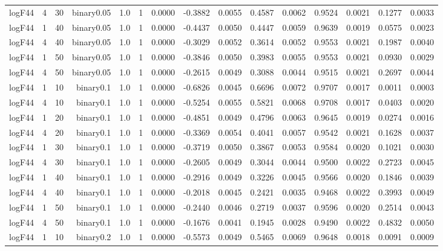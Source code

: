 \begin{longtable}{rrrrrrrrrrrrrrr}
  logF44 & 4 & 30 & binary0.05 & 1.0 & 1 & 0.0000 & -0.3882 & 0.0055 & 0.4587 & 0.0062 & 0.9524 & 0.0021 & 0.1277 & 0.0033 \\ 
  logF44 & 1 & 40 & binary0.05 & 1.0 & 1 & 0.0000 & -0.4437 & 0.0050 & 0.4447 & 0.0059 & 0.9639 & 0.0019 & 0.0575 & 0.0023 \\ 
  logF44 & 4 & 40 & binary0.05 & 1.0 & 1 & 0.0000 & -0.3029 & 0.0052 & 0.3614 & 0.0052 & 0.9553 & 0.0021 & 0.1987 & 0.0040 \\ 
  logF44 & 1 & 50 & binary0.05 & 1.0 & 1 & 0.0000 & -0.3846 & 0.0050 & 0.3983 & 0.0055 & 0.9553 & 0.0021 & 0.0930 & 0.0029 \\ 
  logF44 & 4 & 50 & binary0.05 & 1.0 & 1 & 0.0000 & -0.2615 & 0.0049 & 0.3088 & 0.0044 & 0.9515 & 0.0021 & 0.2697 & 0.0044 \\ 
  logF44 & 1 & 10 & binary0.1 & 1.0 & 1 & 0.0000 & -0.6826 & 0.0045 & 0.6696 & 0.0072 & 0.9707 & 0.0017 & 0.0011 & 0.0003 \\ 
  logF44 & 4 & 10 & binary0.1 & 1.0 & 1 & 0.0000 & -0.5254 & 0.0055 & 0.5821 & 0.0068 & 0.9708 & 0.0017 & 0.0403 & 0.0020 \\ 
  logF44 & 1 & 20 & binary0.1 & 1.0 & 1 & 0.0000 & -0.4851 & 0.0049 & 0.4796 & 0.0063 & 0.9645 & 0.0019 & 0.0274 & 0.0016 \\ 
  logF44 & 4 & 20 & binary0.1 & 1.0 & 1 & 0.0000 & -0.3369 & 0.0054 & 0.4041 & 0.0057 & 0.9542 & 0.0021 & 0.1628 & 0.0037 \\ 
  logF44 & 1 & 30 & binary0.1 & 1.0 & 1 & 0.0000 & -0.3719 & 0.0050 & 0.3867 & 0.0053 & 0.9584 & 0.0020 & 0.1021 & 0.0030 \\ 
  logF44 & 4 & 30 & binary0.1 & 1.0 & 1 & 0.0000 & -0.2605 & 0.0049 & 0.3044 & 0.0044 & 0.9500 & 0.0022 & 0.2723 & 0.0045 \\ 
  logF44 & 1 & 40 & binary0.1 & 1.0 & 1 & 0.0000 & -0.2916 & 0.0049 & 0.3226 & 0.0045 & 0.9566 & 0.0020 & 0.1846 & 0.0039 \\ 
  logF44 & 4 & 40 & binary0.1 & 1.0 & 1 & 0.0000 & -0.2018 & 0.0045 & 0.2421 & 0.0035 & 0.9468 & 0.0022 & 0.3993 & 0.0049 \\ 
  logF44 & 1 & 50 & binary0.1 & 1.0 & 1 & 0.0000 & -0.2440 & 0.0046 & 0.2719 & 0.0037 & 0.9596 & 0.0020 & 0.2514 & 0.0043 \\ 
  logF44 & 4 & 50 & binary0.1 & 1.0 & 1 & 0.0000 & -0.1676 & 0.0041 & 0.1945 & 0.0028 & 0.9490 & 0.0022 & 0.4832 & 0.0050 \\ 
  logF44 & 1 & 10 & binary0.2 & 1.0 & 1 & 0.0000 & -0.5573 & 0.0049 & 0.5465 & 0.0069 & 0.9648 & 0.0018 & 0.0091 & 0.0009 \\ 

\end{longtable}
